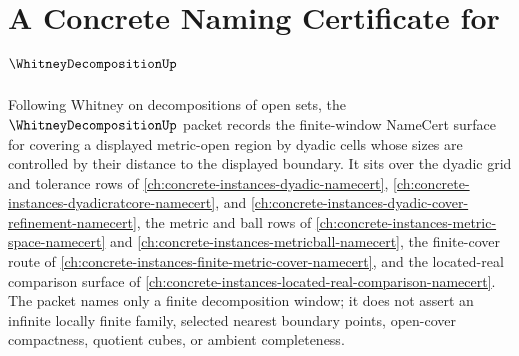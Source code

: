 \chapter{A Concrete Naming Certificate for $\WhitneyDecompositionUp$}
\label{ch:concrete-instances-whitney-decomposition-namecert}

Following Whitney on decompositions of open sets, the $\WhitneyDecompositionUp$ packet records the finite-window NameCert surface for covering a displayed metric-open region by dyadic cells whose sizes are controlled by their distance to the displayed boundary. It sits over the dyadic grid and tolerance rows of \autoref{ch:concrete-instances-dyadic-namecert}, \autoref{ch:concrete-instances-dyadicratcore-namecert}, and \autoref{ch:concrete-instances-dyadic-cover-refinement-namecert}, the metric and ball rows of \autoref{ch:concrete-instances-metric-space-namecert} and \autoref{ch:concrete-instances-metricball-namecert}, the finite-cover route of \autoref{ch:concrete-instances-finite-metric-cover-namecert}, and the located-real comparison surface of \autoref{ch:concrete-instances-located-real-comparison-namecert}. The packet names only a finite decomposition window; it does not assert an infinite locally finite family, selected nearest boundary points, open-cover compactness, quotient cubes, or ambient completeness.

